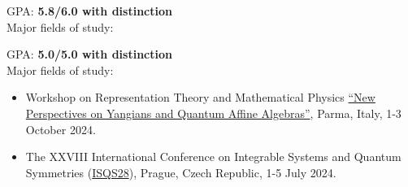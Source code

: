 \documentclass[10pt,a4paper,ragged2e,withhyper]{altacv}
\begin{document}
\begin{paracol}{2}
\medskip

{\color{ETHBlue80} GPA:} \textbf{5.8/6.0 with distinction}\\
{\color{ETHBlue80}Major fields of study:}     
 
\medskip

{\color{ETHBlue80} GPA:} \textbf{5.0/5.0 with distinction}\\
{\color{ETHBlue80}Major fields of study:}      
 
\newpage

\begin{itemize}
  \item Workshop on Representation Theory and Mathematical Physics \href{https://smfi.unipr.it/en/node/100218}{\color{ETHBlue120}``New Perspectives on Yangians and Quantum Affine Algebras''}, Parma, Italy, 1-3 October 2024.
  \item The XXVIII International Conference on Integrable Systems and Quantum Symmetries (\href{http://isqs.eu/}{\color{ETHBlue120}ISQS28}), Prague, Czech Republic, 1-5 July 2024.
\end{itemize}


\switchcolumn


\end{paracol}
\end{document}
